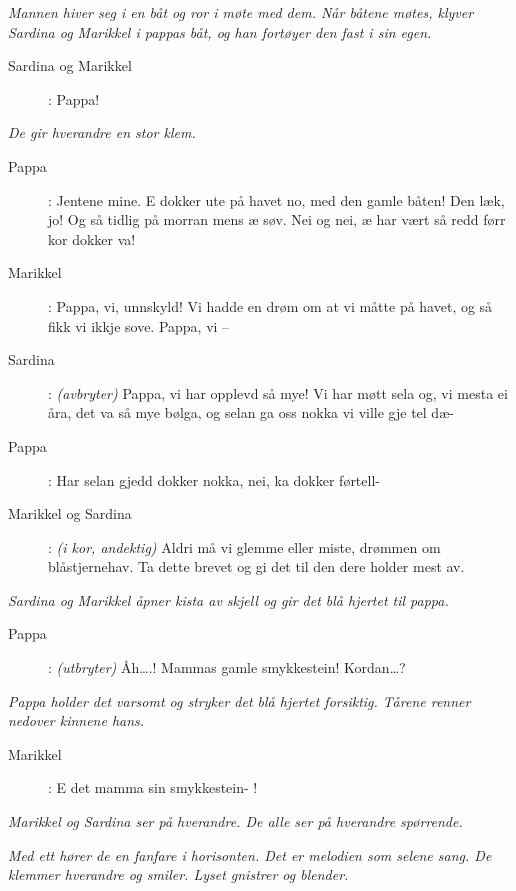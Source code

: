 {\noindent \textit{\color{gray} Mannen hiver seg i en båt og ror i møte med dem. Når båtene møtes, klyver Sardina og Marikkel i pappas båt, og han fortøyer den fast i sin egen.}

\begin{description}
\item[Sardina og Marikkel]: Pappa! 
\end{description}

\noindent \textit{\color{gray} De gir hverandre en stor klem.}

\begin{description}
\item[Pappa]: Jentene mine. E dokker ute på havet no, med den gamle båten! Den læk, jo! Og så tidlig på morran mens æ søv. Nei og nei, æ har vært så redd førr kor dokker va! 
\item[Marikkel]: Pappa, vi, unnskyld! Vi hadde en drøm om at vi måtte på havet, og så fikk vi ikkje sove. Pappa, vi –
\item[Sardina]: \textit{\color{gray} (avbryter)} Pappa, vi har opplevd så mye! Vi har møtt sela og, vi mesta ei åra, det va så mye bølga, og selan ga oss nokka vi ville gje tel dæ-
\item[Pappa]: Har selan gjedd dokker nokka, nei, ka dokker førtell- 
\item[Marikkel og Sardina]: \textit{\color{gray} (i kor, andektig)} Aldri må vi glemme eller miste, drømmen om blåstjernehav. Ta dette brevet og gi det til den dere holder mest av. 
\end{description}

\noindent \textit{\color{gray} Sardina og Marikkel åpner kista av skjell og gir det blå hjertet til pappa.}

\begin{description}
\item[Pappa]: \textit{\color{gray} (utbryter)} Åh….! Mammas gamle smykkestein! Kordan…?
\end{description}

\noindent \textit{\color{gray} Pappa holder det varsomt og stryker det blå hjertet forsiktig. Tårene renner nedover kinnene hans.}

\begin{description}
\item[Marikkel]: E det mamma sin smykkestein- ! 
\end{description}

\noindent \textit{\color{gray} Marikkel og Sardina ser på hverandre. De alle ser på hverandre spørrende.} 

\noindent \textit{\color{gray} Med ett hører de en fanfare i horisonten. Det er melodien som selene sang. De klemmer hverandre og smiler. Lyset gnistrer og blender.}
\color{black}
\label{shtp2}}


